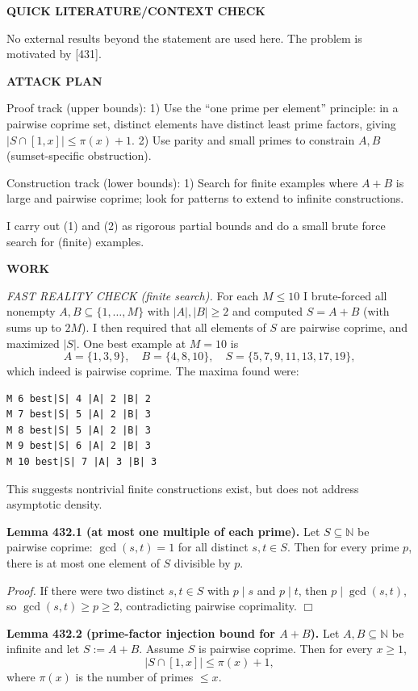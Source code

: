 \medskip
\noindent\textbf{QUICK LITERATURE/CONTEXT CHECK}

No external results beyond the statement are used here. The problem is motivated by [431].

\medskip
\noindent\textbf{ATTACK PLAN}

Proof track (upper bounds):
1) Use the ``one prime per element'' principle: in a pairwise coprime set, distinct elements have distinct least prime factors, giving $|S\cap[1,x]|\le \pi(x)+1$.
2) Use parity and small primes to constrain $A,B$ (sumset-specific obstruction).

Construction track (lower bounds):
1) Search for finite examples where $A+B$ is large and pairwise coprime; look for patterns to extend to infinite constructions.

I carry out (1) and (2) as rigorous partial bounds and do a small brute force search for (finite) examples.

\medskip
\noindent\textbf{WORK}

\noindent\emph{FAST REALITY CHECK (finite search).}
For each $M\le 10$ I brute-forced all nonempty $A,B\subseteq\{1,\dots,M\}$ with $|A|,|B|\ge 2$ and computed $S=A+B$ (with sums up to $2M$). I then required that all elements of $S$ are pairwise coprime, and maximized $|S|$.
One best example at $M=10$ is
\[A=\{1,3,9\},\quad B=\{4,8,10\},\quad S=\{5,7,9,11,13,17,19\},\]
which indeed is pairwise coprime.
The maxima found were:
\begin{verbatim}
M 6 best|S| 4 |A| 2 |B| 2
M 7 best|S| 5 |A| 2 |B| 3
M 8 best|S| 5 |A| 2 |B| 3
M 9 best|S| 6 |A| 2 |B| 3
M 10 best|S| 7 |A| 3 |B| 3
\end{verbatim}
This suggests nontrivial finite constructions exist, but does not address asymptotic density.

\medskip
\noindent\textbf{Lemma 432.1 (at most one multiple of each prime).}
Let $S\subseteq\mathbb N$ be pairwise coprime: $\gcd(s,t)=1$ for all distinct $s,t\in S$. Then for every prime $p$, there is at most one element of $S$ divisible by $p$.

\noindent\emph{Proof.}
If there were two distinct $s,t\in S$ with $p\mid s$ and $p\mid t$, then $p\mid\gcd(s,t)$, so $\gcd(s,t)\ge p\ge 2$, contradicting pairwise coprimality. \hfill$\Box$

\medskip
\noindent\textbf{Lemma 432.2 (prime-factor injection bound for $A+B$).}
Let $A,B\subseteq\mathbb N$ be infinite and let $S:=A+B$. Assume $S$ is pairwise coprime. Then for every $x\ge 1$,
\[
|S\cap[1,x]|\le \pi(x)+1,
\]
where $\pi(x)$ is the number of primes $\le x$.

